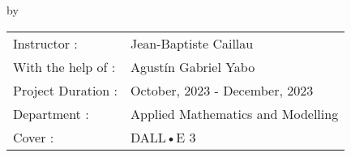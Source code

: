 \begin{titlepage}

\begin{center}
{\makeatletter
\largetitlestyle\fontsize{45}{45}\selectfont\@title
\makeatother}

{\makeatletter
\ifdefvoid{\@subtitle}{}{\bigskip\titlestyle\fontsize{20}{20}\selectfont\@subtitle}
\makeatother}

\bigskip
\bigskip

by

\bigskip
\bigskip

{\makeatletter
\largetitlestyle\fontsize{25}{25}\selectfont\@author
\makeatother}

\bigskip
\bigskip

\setlength\extrarowheight{2pt}


\vfill

\begin{tabular}{ll}
    Instructor : & Jean-Baptiste Caillau \\
    With the help of : & Agustín Gabriel Yabo \\
    Project Duration : & October, 2023 - December, 2023 \\
    Department : & Applied Mathematics and Modelling\\
    Cover : & DALL•E 3
\end{tabular}

\bigskip
\bigskip

\begin{tabular}{p{15mm}p{10cm}}
\end{tabular}

\end{center}



\end{titlepage}
